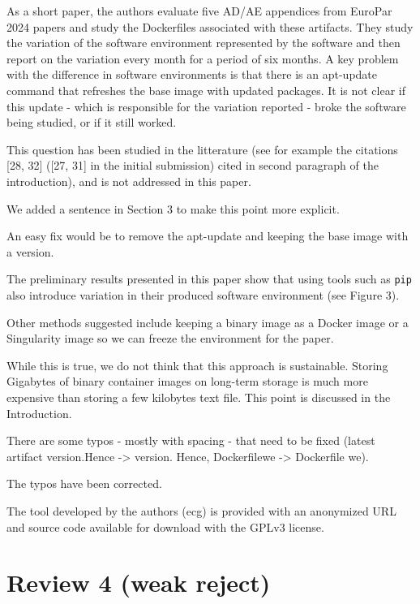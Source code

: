 \documentclass[%
	11pt,
	final,
]{article}
\begin{document}
As a short paper, the authors evaluate five AD/AE appendices from EuroPar 2024 papers and study the Dockerfiles associated with these artifacts.
They study the variation of the software environment represented by the software and then report on the variation every month for a period of six months.
A key problem with the difference in software environments is that there is an apt-update command that refreshes the base image with updated packages.
It is not clear if this update - which is responsible for the variation reported - broke the software being studied, or if it still worked.
\begin{review-answer}
  This question has been studied in the litterature (see for example the citations [28, 32] ([27, 31] in the initial submission) cited in second paragraph of the introduction), and is not addressed in this paper.


We added a sentence in Section 3 to make this point more explicit.
\end{review-answer}
An easy fix would be to remove the apt-update and keeping the base image with a version.
\begin{review-answer}
  The preliminary results presented in this paper show that using tools such as \texttt{pip} also introduce variation in their produced software environment (see Figure 3).
\end{review-answer}
Other methods suggested include keeping a binary image as a Docker image or a Singularity image so we can freeze the environment for the paper.
\begin{review-answer}
  While this is true, we do not think that this approach is sustainable.
  Storing Gigabytes of binary container images on long-term storage is much more expensive than storing a few kilobytes text file.
  This point is discussed in the Introduction.
\end{review-answer}
There are some typos - mostly with spacing - that need to be fixed (latest artifact version.Hence -> version. Hence, Dockerfilewe -> Dockerfile we).
\begin{review-answer}
  The typos have been corrected.
\end{review-answer}
The tool developed by the authors (ecg) is provided with an anonymized URL and source code available for download with the GPLv3 license.


\section{Review 4 (weak reject)}
\end{document}
